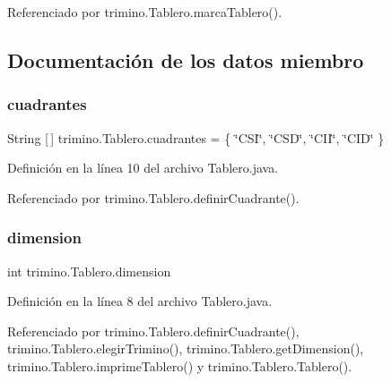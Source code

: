 Referenciado por trimino.\+Tablero.\+marca\+Tablero().



\subsection{Documentación de los datos miembro}
\mbox{\label{classtrimino_1_1Tablero_ac1b1c9acb509c594fcae4b7d7ebb765e}} 
\subsubsection{\texorpdfstring{cuadrantes}{cuadrantes}}
{\footnotesize\ttfamily String \mbox{[}$\,$\mbox{]} trimino.\+Tablero.\+cuadrantes = \{ \char`\"{}C\+SI\char`\"{}, \char`\"{}C\+SD\char`\"{}, \char`\"{}C\+II\char`\"{}, \char`\"{}C\+ID\char`\"{} \}\hspace{0.3cm}{\ttfamily [private]}}



Definición en la línea 10 del archivo Tablero.\+java.



Referenciado por trimino.\+Tablero.\+definir\+Cuadrante().

\mbox{\label{classtrimino_1_1Tablero_a99d732d6a9b3b2d75ed7bc5bbe6a22f7}} 
\subsubsection{\texorpdfstring{dimension}{dimension}}
{\footnotesize\ttfamily int trimino.\+Tablero.\+dimension\hspace{0.3cm}{\ttfamily [private]}}



Definición en la línea 8 del archivo Tablero.\+java.



Referenciado por trimino.\+Tablero.\+definir\+Cuadrante(), trimino.\+Tablero.\+elegir\+Trimino(), trimino.\+Tablero.\+get\+Dimension(), trimino.\+Tablero.\+imprime\+Tablero() y trimino.\+Tablero.\+Tablero().

\mbox{\label{classtrimino_1_1Tablero_a8b1b74a3a0b60de392313de57a6ea404}} 
